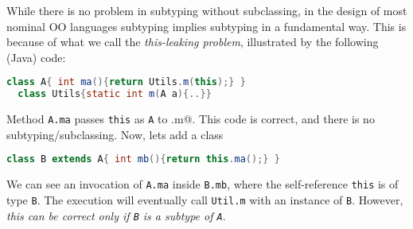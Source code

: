 While there is no problem in subtyping without subclassing, in the design
of most nominal OO languages subtyping implies subtyping in a
fundamental way. This is because of what we call the
\emph{this-leaking problem}, illustrated by the following
(Java) code:

\begin{lstlisting}[language=Java]
  class A{ int ma(){return Utils.m(this);} }
  class Utils{static int m(A a){..}}
\end{lstlisting}

Method \lstinline{A.ma} passes \lstinline{this} as \lstinline{A} to \Q@Util.m@.
This code is correct, and there is no subtyping/subclassing.  Now, lets add a class \Q@B@

\begin{lstlisting}[language=Java]
  class B extends A{ int mb(){return this.ma();} }  
\end{lstlisting}

\noindent We can see an invocation of \lstinline{A.ma} inside
\lstinline{B.mb}, where the self-reference \lstinline{this} is of type \lstinline{B}. 
The execution will eventually call \lstinline{Util.m} with an
instance of \lstinline{B}. However, \emph{this can be correct only if \lstinline{B} is a subtype of
\lstinline{A}}. 

%
%


